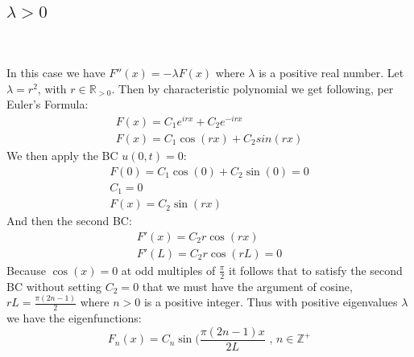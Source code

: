 \documentclass{article}
\begin{document}
\subsection*{$\lambda > 0$}~\\
\\
In this case we have $F''(x) = -\lambda F(x)$ where $\lambda$ is a positive real number. Let $\lambda = r^2$, with $r \in \mathbb{R}_{>0}$. Then by characteristic polynomial we get following, per Euler's Formula:
\begin{equation}
\begin{aligned}
F(x) = C_1e^{irx} + C_2e^{-irx}\\
F(x) = C_1\cos(rx)+C_2sin(rx)
\end{aligned}
\end{equation}
We then apply the BC $u(0,t) = 0$:
\begin{equation}
\begin{aligned}
F(0) = C_1\cos(0) + C_2\sin(0) = 0\\
C_1 = 0\\
F(x) = C_2\sin(rx)
\end{aligned}
\end{equation}
And then the second BC:
\begin{equation}
\begin{aligned}
F'(x) = C_2r\cos(rx)\\
F'(L) = C_2r\cos(rL) = 0
\end{aligned}
\end{equation}
Because $\cos(x) = 0$ at odd multiples of $\frac{\pi}{2}$ it follows that to satisfy the second BC without setting $C_2 = 0$ that we must have the argument of cosine, $rL = \frac{\pi(2n-1)}{2}$ where $n > 0$ is a positive integer. Thus with positive eigenvalues $\lambda$ we have the eigenfunctions:
\begin{equation}
F_n(x) = C_n\sin(\frac{\pi(2n-1)x}{2L} \text{ , } n \in \mathbb{Z}^+
\end{equation}
\end{document}
